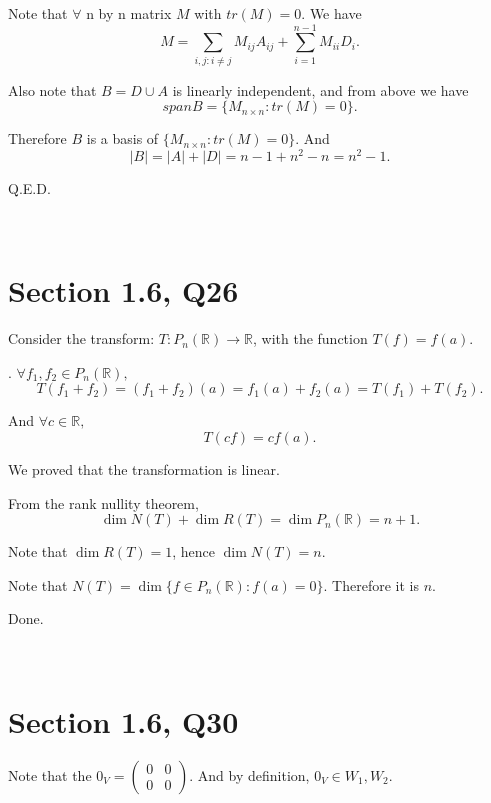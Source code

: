 \documentclass[12pt]{article}%
\begin{document}
Note that $\forall$ n by n matrix $M$ with $tr(M)=0.$ We have $$M=\sum_{i,j: i\neq j}M_{ij}A_{ij} + \sum_{i=1}^{n-1}M_{ii}D_i.$$ 

Also note that $B= D \cup A$ is linearly independent, and from above we have $$span{B}=\{M_{n \times n}:tr(M)=0\}.$$

Therefore $B$ is a basis of $\{M_{n \times n}:tr(M)=0\}.$ And $$|B|=|A|+|D|=n-1+n^2-n=n^2-1.$$

Q.E.D.

~\ 




\section{Section 1.6, Q26}

Consider the transform: $T: P_n(\mathbb{R})\to \mathbb{R}$, with the function $T(f)=f(a).$ 

. $\forall f_1,f_2 \in P_n(\mathbb{R}),$ $$T(f_1+f_2)=(f_1+f_2)(a)=f_1(a)+f_2(a)=T(f_1)+T(f_2).$$

And $\forall c \in \mathbb{R},$ $$T(cf)=cf(a).$$

We proved that the transformation is linear.

From the rank nullity theorem, $$\dim{N(T)}+\dim{R(T)}=\dim{P_n(\mathbb{R})}=n+1.$$

Note that $\dim{R(T)}=1$, hence $\dim{N(T)}=n.$ 

Note that $N(T)=\dim\{f\in P_n(\mathbb{R}) :f(a)=0\}.$ Therefore it is $n.$

Done. 

~\ 



\section{Section 1.6, Q30}

Note that the $0_V=\begin{pmatrix}
                        0 & 0
                        \\0 & 0
                    \end{pmatrix}$. And by definition, $0_V \in W_1,W_2.$
\end{document}
